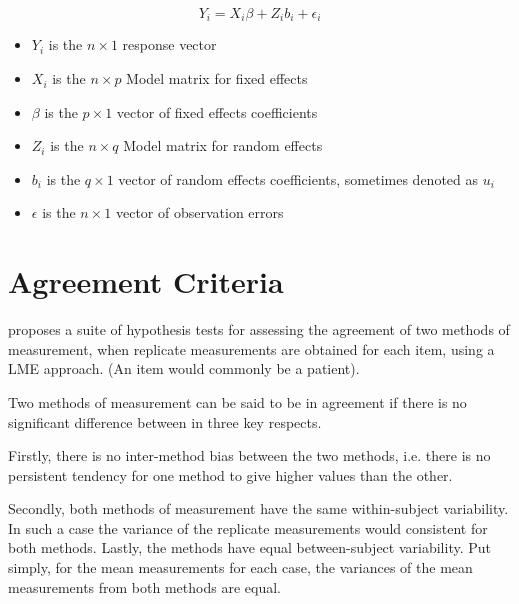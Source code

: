 \documentclass[12pt, a4paper]{report}
\theoremstyle{plain}
\theoremstyle{definition}
\theoremstyle{remark}
\begin{document}
\begin{displaymath}
	Y_{i} =X_{i}\beta + Z_{i}b_{i} + \epsilon_{i}
\end{displaymath}
\begin{itemize}
	
	\item $Y_{i}$ is the $n \times 1$ response vector \item $X_{i}$ is
	the $n \times p$ Model matrix for fixed effects \item $\beta$ is
	the $p \times 1$ vector of fixed effects coefficients \item
	$Z_{i}$ is the $n \times q$ Model matrix for random effects \item
	$b_{i}$ is the $q \times 1$ vector of random effects coefficients,
	sometimes denoted as $u_{i}$ \item $\epsilon$ is the $n \times 1$
	vector of observation errors
\end{itemize}



	







	\section{Agreement Criteria}

		
	\citet{ARoy2009} proposes a suite of hypothesis tests for assessing the agreement of two methods of measurement, when replicate measurements are obtained for each item, using a LME approach. (An item would commonly be a patient).  
	
	Two methods of measurement can be said to be in agreement if there is no significant difference between in three key respects. 
	
	Firstly, there is no inter-method bias between the two methods, i.e. there is no persistent tendency for one method to give higher values than the other.
	
	Secondly, both methods of measurement have the same  within-subject variability. In such a case the variance of the replicate measurements would consistent for both methods.
	Lastly, the methods have equal between-subject variability.  Put simply, for the mean measurements for each case, the variances of the mean measurements from both methods are equal.
	
\end{document}

